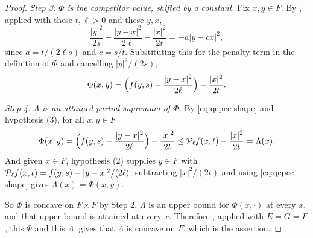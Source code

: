 \begin{proof}
\emph{Step 3: $\Phi$ is the competitor value, shifted by a constant.}
Fix $x,y\in F$. By , applied with these $t,\ell>0$ and
these $y,x$,
\[
  \frac{|y|^2}{2s}-\frac{|y-x|^2}{2\ell}-\frac{|x|^2}{2t}=-a\bigl|y-cx\bigr|^2 ,
\]
since $a=t/(2\ell s)$ and $c=s/t$. Substituting this for the penalty term in the
definition of $\Phi$ and cancelling $|y|^2/(2s)$,
\begin{equation}\label{eq:qepcc-shape}
  \Phi(x,y)=\Bigl(f(y,s)-\frac{|y-x|^2}{2\ell}\Bigr)-\frac{|x|^2}{2t}.
\end{equation}

\emph{Step 4: $\Lambda$ is an attained partial supremum of $\Phi$.}
By \eqref{eq:qepcc-shape} and hypothesis (3), for all $x,y\in F$
\[
  \Phi(x,y)=\Bigl(f(y,s)-\frac{|y-x|^2}{2\ell}\Bigr)-\frac{|x|^2}{2t}
   \le\mathcal{P}_\ell f(x,t)-\frac{|x|^2}{2t}=\Lambda(x).
\]
And given $x\in F$, hypothesis (2) supplies $y\in F$ with
$\mathcal{P}_\ell f(x,t)=f(y,s)-|y-x|^2/(2\ell)$; subtracting $|x|^2/(2t)$ and using
\eqref{eq:qepcc-shape} gives $\Lambda(x)=\Phi(x,y)$.

So $\Phi$ is concave on $F\times F$ by Step 2, $\Lambda$ is an upper bound for
$\Phi(x,\cdot)$ at every $x$, and that upper bound is attained at every $x$. Therefore
, applied with $E=G=F$, this $\Phi$ and this
$\Lambda$, gives that $\Lambda$ is concave on $F$, which is the assertion.
\end{proof}
